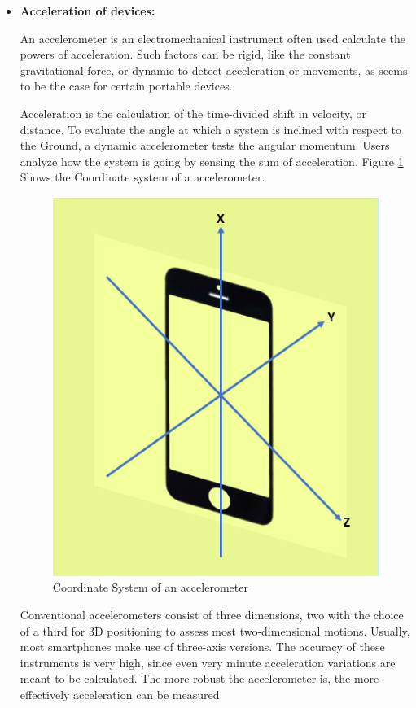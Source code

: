 \begin{itemize}
    \item \textbf{Acceleration of devices:} 
    
An accelerometer is an electromechanical instrument often used calculate the powers of acceleration. Such factors can be rigid, like the constant gravitational force, or dynamic to detect acceleration or movements, as seems to be the case for certain portable devices. 

\vspace{0.5cm}
Acceleration is the calculation of the time-divided shift in velocity, or distance.
To evaluate the angle at which a system is inclined with respect to the Ground, a dynamic accelerometer tests the angular momentum. Users analyze how the system is going by sensing the sum of acceleration. Figure \ref{fig:Accel} Shows the Coordinate system of a accelerometer. 

\begin{figure}[!ht]
    \centering
    \includegraphics[scale=0.5]{Chap4/Capture.PNG}
    \caption{Coordinate System of an accelerometer}
    \label{fig:Accel}
\end{figure}

\vspace{0.5cm}
Conventional accelerometers consist of three dimensions, two with the choice of a third for 3D positioning to assess most two-dimensional motions. Usually, most smartphones make use of three-axis versions. The accuracy of these instruments is very high, since even very minute acceleration variations are meant to be calculated. The more robust the accelerometer is, the more effectively acceleration can be measured.


\end{itemize}
